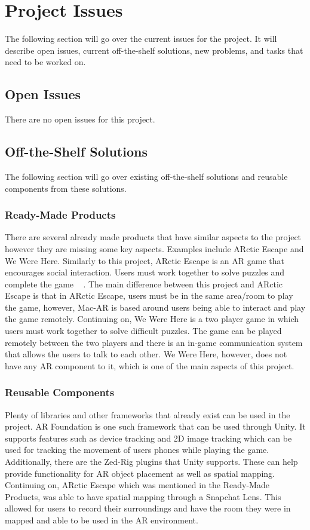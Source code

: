 \documentclass[12pt]{article}
\begin{document}
\section{Project Issues}
The following section will go over the current issues for the project. It will describe open issues, current off-the-shelf solutions, new problems, and tasks that need to be worked on.

\subsection{Open Issues}
There are no open issues for this project.

\subsection{Off-the-Shelf Solutions}
The following section will go over existing off-the-shelf solutions and reusable components from these solutions.

\subsubsection{Ready-Made Products}
There are several already made products that have similar aspects to the project however they are missing some key aspects. Examples include ARctic Escape and We Were Here. Similarly to this project, ARctic Escape is an AR game that encourages social interaction. Users must work together to solve puzzles and complete the game ~\citep{ARcticEscape} . The main difference between this project and ARctic Escape is that in ARctic Escape, users must be in the same area/room to play the game, however, Mac-AR is based around users being able to interact and play the game remotely. Continuing on, We Were Here is a two player game in which users must work together to solve difficult puzzles. The game can be played remotely between the two players and there is an in-game communication system that allows the users to talk to each other. We Were Here, however, does not have any AR component to it, which is one of the main aspects of this project.

\subsubsection{Reusable Components}
Plenty of libraries and other frameworks that already exist can be used in the project. AR Foundation is one such framework that can be used through Unity. It supports features such as device tracking and 2D image tracking which can be used for tracking the movement of users phones while playing the game. Additionally, there are the Zed-Rig plugins that Unity supports. These can help provide functionality for AR object placement as well as spatial mapping. Continuing on, ARctic Escape which was mentioned in the Ready-Made Products, was able to have spatial mapping through a Snapchat Lens. This allowed for users to record their surroundings and have the room they were in mapped and able to be used in the AR environment.
\end{document}
